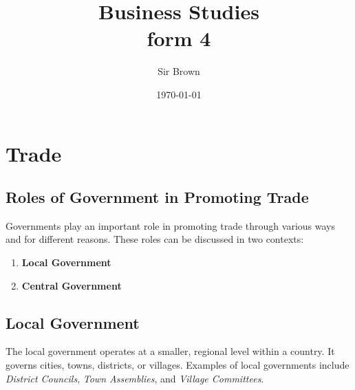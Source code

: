 \documentclass[14pt,a4paper, openany]{book}
\begin{document}
\frontmatter
\title{Business Studies \\ form 4}
\author{Sir Brown}
\date{\today}

\maketitle




\mainmatter
\chapter{Trade}
\section{Roles of Government in Promoting Trade}
Governments play an important role in promoting trade through various ways and for different reasons.
These roles can be discussed in two contexts:
\begin{enumerate}
	\item \textbf{Local Government}
	\item \textbf{Central Government}
\end{enumerate}

\section{Local Government}
The local government operates at a smaller, regional level within a country.
It governs cities, towns, districts, or villages.
Examples of local governments include \textit{District Councils}, \textit{Town Assemblies}, and \textit{Village Committees}.
\end{document}
